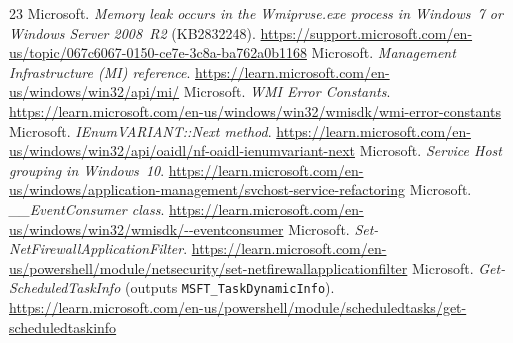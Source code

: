 \documentclass[letterpaper,twocolumn,10pt]{article}
\begin{document}
\begin{thebibliography}{23}
 Microsoft. \emph{Memory leak occurs in the Wmiprvse.exe process in Windows~7 or Windows Server 2008~R2} (KB2832248). \url{https://support.microsoft.com/en-us/topic/067c6067-0150-ce7e-3c8a-ba762a0b1168}
 Microsoft. \emph{Management Infrastructure (MI) reference}. \url{https://learn.microsoft.com/en-us/windows/win32/api/mi/}
 Microsoft. \emph{WMI Error Constants}. \url{https://learn.microsoft.com/en-us/windows/win32/wmisdk/wmi-error-constants}
 Microsoft. \emph{IEnumVARIANT::Next method}. \url{https://learn.microsoft.com/en-us/windows/win32/api/oaidl/nf-oaidl-ienumvariant-next}
 Microsoft. \emph{Service Host grouping in Windows~10}. \url{https://learn.microsoft.com/en-us/windows/application-management/svchost-service-refactoring}
 Microsoft. \emph{\_\_EventConsumer class}. \url{https://learn.microsoft.com/en-us/windows/win32/wmisdk/--eventconsumer}
 Microsoft. \emph{Set-NetFirewallApplicationFilter}. \url{https://learn.microsoft.com/en-us/powershell/module/netsecurity/set-netfirewallapplicationfilter}
 Microsoft. \emph{Get-ScheduledTaskInfo} (outputs \texttt{MSFT\_TaskDynamicInfo}). \url{https://learn.microsoft.com/en-us/powershell/module/scheduledtasks/get-scheduledtaskinfo}
\end{thebibliography}
\end{document}
